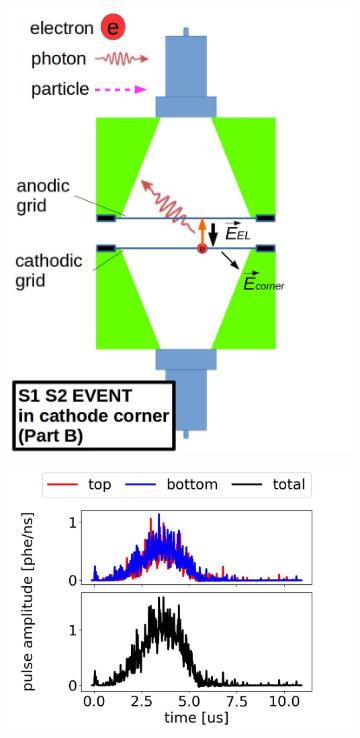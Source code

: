 \begin{figure}[!htbp]
\begin{subfigure}[b]{0.8\textwidth}
		\includegraphics[width=\halfwidth,clip,trim={0 0 0 0},angle=0,origin=c]{Figures/GasTest/WeiDrawEvent/S1S2B.jpg}
		\caption{}
		\label{fig:cathode corner b}
	\end{subfigure}
	\par\bigskip
	\begin{subfigure}[b]{0.7\textwidth}
		\centering
		\includegraphics[width=\figurewidth,clip,trim={0 0 0 0}]{Figures/GasTest/exampleWaveforms/proc64767id00000145.jpg}%

\end{subfigure}
\end{figure}
